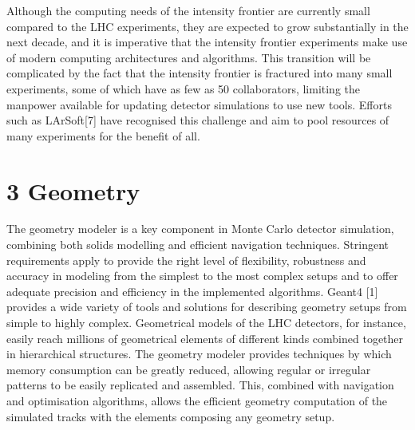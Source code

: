 \documentclass[12pt,a4paper]{article}
\begin{document}
Although the computing needs of the intensity frontier are currently
small compared to the LHC experiments, they are expected to grow
substantially in the next decade, and it is imperative that the
intensity frontier experiments make use of modern computing
architectures and algorithms. This transition will be complicated by the
fact that the intensity frontier is fractured into many small
experiments, some of which have as few as 50 collaborators, limiting the
manpower available for updating detector simulations to use new tools.
Efforts such as LArSoft{[}7{]} have recognised this challenge and aim to
pool resources of many experiments for the benefit of all.

\hypertarget{geometry}{%
\section{3 Geometry}\label{geometry}}

The geometry modeler is a key component in Monte Carlo detector
simulation, combining both solids modelling and efficient navigation
techniques. Stringent requirements apply to provide the right level of
flexibility, robustness and accuracy in modeling from the simplest to
the most complex setups and to offer adequate precision and efficiency
in the implemented algorithms. Geant4 {[}1{]} provides a wide variety of
tools and solutions for describing geometry setups from simple to highly
complex. Geometrical models of the LHC detectors, for instance, easily
reach millions of geometrical elements of different kinds combined
together in hierarchical structures. The geometry modeler provides
techniques by which memory consumption can be greatly reduced, allowing
regular or irregular patterns to be easily replicated and assembled.
This, combined with navigation and optimisation algorithms, allows the
efficient geometry computation of the simulated tracks with the elements
composing any geometry setup.
\end{document}
